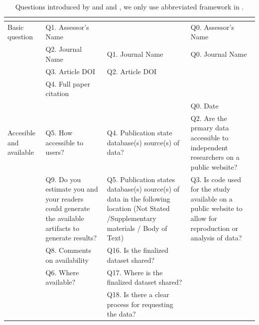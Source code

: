 \documentclass[12pt, a4paper, twocolumn]{article}
\begin{document}
	\begin{table}[]
	\centering
	\caption[]{Questions introduced by \citet{stagge2019assessing} and  \citet{mcintosh2017repeat} and \citet{QualityOutputChecklist}, we only use abbreviated framework in \citet{mcintosh2017repeat}. }\label{tab:survey_table_2}
	\begin{tabular}{>{\raggedright\arraybackslash}p{}>{\raggedright\arraybackslash}p{} >{\raggedright\arraybackslash}p{}>{\raggedright\arraybackslash}p{}}  
	\hline
	&\citet{stagge2019assessing}         & \citet{mcintosh2017repeat}   &\citet{QualityOutputChecklist} \\                     
        \hline
	Basic question                &Q1. Assessor's Name             &                                                        &Q0. Assessor's Name                        \\
	&Q2. Journal Name                                                    & Q1. Journal Name                                &Q0. Journal Name                        \\
	&Q3. Article DOI                                                       &  Q2. Article DOI                                 &                     \\
	&Q4. Full paper citation                              &          & \\               
	&			&              & Q0. Date            	                     \\  
      \hline
	Accesible and available &Q5. How accessible to users?   &Q4. Publication state database(s) source(s) of data?       & Q2. Are the prmary data accessible to independent researchers on a public website?  \\
	 &Q9. Do you estimate you and your readers could generate the available artifacts to generate results?     &Q5. Publication states database(s) source(s) of data in the following location (Not Stated /Supplementary materials / Body of Text)          &Q3. Is code used for the study available on a public website to allow for reproduction or analysis of data?                                  \\
&Q8. Comments on availability  &Q16. Is the finalized dataset shared?   & \\
&Q6. Where available?&Q17. Where is the finalized dataset shared?      & \\
&& Q18. Is there a clear process for requesting the data?  & \\
	\hline

\end{tabular}
\end{table}
\end{document}
